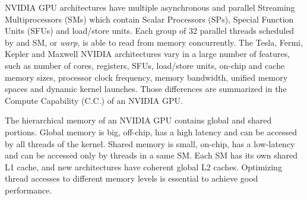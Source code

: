 NVIDIA GPU architectures have multiple asynchronous and parallel Streaming
Multiprocessors (SMs) which contain Scalar Processors (SPs), Special Function
Units (SFUs) and load/store units. Each group of 32 parallel threads scheduled
by and SM, or \textit{warp}, is able to read from memory concurrently.  The
Tesla, Fermi, Kepler and Maxwell NVIDIA architectures vary in a large number of
features, such as number of cores, registers, SFUs, load/store units, on-chip
and cache memory sizes, processor clock frequency, memory bandwidth, unified
memory spaces and dynamic kernel launches.  Those differences are summarized in
the Compute Capability (C.C.) of an NVIDIA GPU.


The hierarchical memory of an NVIDIA GPU contains global and shared portions.
Global memory is big, off-chip, has a high latency and can be accessed by all
threads of the kernel.  Shared memory is small, on-chip, has a low-latency and
can be accessed only by threads in a same SM.  Each SM has its own shared L1
cache, and new architectures have coherent global L2 caches.  Optimizing thread
accesses to different memory levels is essential to achieve good performance.



